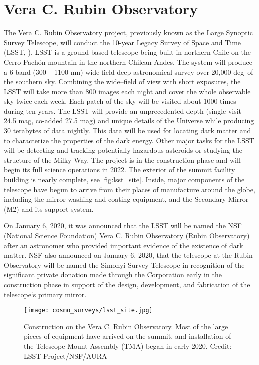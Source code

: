 \section{Vera C. Rubin Observatory}
The Vera C. Rubin Observatory project, previously known as the Large Synoptic Survey Telescope, will conduct the 10-year Legacy Survey of Space and Time (LSST, \cite{lsst}). LSST is a ground-based telescope being built in northern Chile on the Cerro Pach\'{o}n mountain in the northern Chilean Andes. The system will produce a 6-band (300 -- 1100 nm) wide-field deep astronomical survey over 20,000 deg\sq\ of the southern sky. Combining the wide--field of view with short exposures, the LSST will take more than 800 images each night and cover the whole observable sky twice each week. Each patch of the sky will be visited about 1000 times during ten years. The LSST will provide an unprecedented depth (single-visit 24.5 mag, co-added 27.5 mag) and unique details of the Universe while producing 30 terabytes of data nightly. This data will be used for locating dark matter and to characterize the properties of the dark energy. Other major tasks for the LSST will be detecting and tracking potentially hazardous asteroids or studying the structure of the Milky Way. The project is in the construction phase and will begin its full science operations in 2022. The exterior of the summit facility building is nearly complete, see \autoref{fig:lsst_site}. Inside, major components of the telescope have begun to arrive from their places of manufacture around the globe, including the mirror washing and coating equipment, and the Secondary Mirror (M2) and its support system.

On January 6, 2020, it was announced that the LSST will be named the NSF (National Science Foundation) Vera C. Rubin Observatory (Rubin Observatory) after an astronomer who provided important evidence of the existence of dark matter. NSF also announced on January 6, 2020, that the telescope at the Rubin Observatory will be named the Simonyi Survey Telescope in recognition of the significant private donation made through the Corporation early in the construction phase in support of the design, development, and fabrication of the telescope`s primary mirror.
\begin{figure}[htb]
    \centering
    \texttt{[image: cosmo\_surveys/lsst\_site.jpg]}
    \caption{Construction on the Vera C. Rubin Observatory. Most of the large pieces of equipment have arrived on the summit, and installation of the Telescope Mount Assembly (TMA) began in early 2020. Credit: LSST Project/NSF/AURA}
    \label{fig:lsst_site}
\end{figure}

